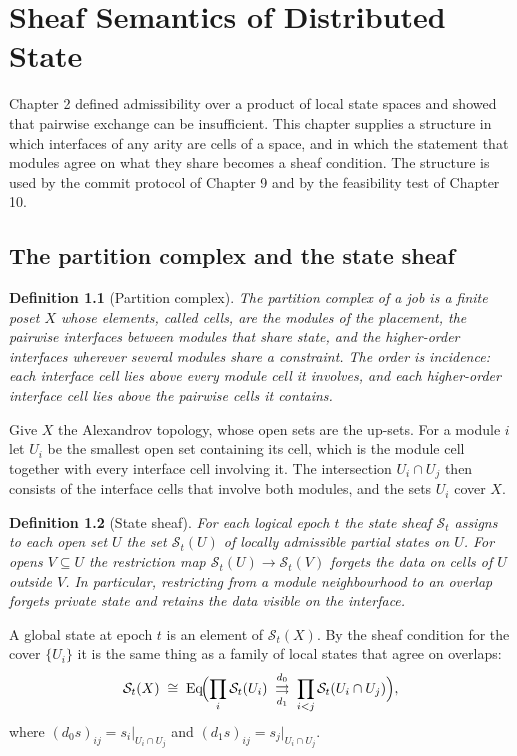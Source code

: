 \documentclass[11pt,openany]{book}
\newtheorem{definition}{Definition}[chapter]
\theoremstyle{remark}
\begin{document}
\chapter{Sheaf Semantics of Distributed State}

Chapter 2 defined admissibility over a product of local state spaces and showed that pairwise exchange can be insufficient. This chapter supplies a structure in which interfaces of any arity are cells of a space, and in which the statement that modules agree on what they share becomes a sheaf condition. The structure is used by the commit protocol of Chapter 9 and by the feasibility test of Chapter 10.

\section{The partition complex and the state sheaf}

\begin{definition}[Partition complex]
The partition complex of a job is a finite poset $X$ whose elements, called cells, are the modules of the placement, the pairwise interfaces between modules that share state, and the higher-order interfaces wherever several modules share a constraint. The order is incidence: each interface cell lies above every module cell it involves, and each higher-order interface cell lies above the pairwise cells it contains.
\end{definition}

Give $X$ the Alexandrov topology, whose open sets are the up-sets. For a module $i$ let $U_i$ be the smallest open set containing its cell, which is the module cell together with every interface cell involving it. The intersection $U_i\cap U_j$ then consists of the interface cells that involve both modules, and the sets $U_i$ cover $X$.

\begin{definition}[State sheaf]
For each logical epoch $t$ the state sheaf $\mathcal S_t$ assigns to each open set $U$ the set $\mathcal S_t(U)$ of locally admissible partial states on $U$. For opens $V\subseteq U$ the restriction map $\mathcal S_t(U)\to\mathcal S_t(V)$ forgets the data on cells of $U$ outside $V$. In particular, restricting from a module neighbourhood to an overlap forgets private state and retains the data visible on the interface.
\end{definition}

A global state at epoch $t$ is an element of $\mathcal S_t(X)$. By the sheaf condition for the cover $\{U_i\}$ it is the same thing as a family of local states that agree on overlaps:
\[
\mathcal S_t(X)\;\cong\;\operatorname{Eq}\!\Bigl(\prod_i\mathcal S_t(U_i)\;\overset{d_0}{\underset{d_1}{\rightrightarrows}}\;\prod_{i<j}\mathcal S_t(U_i\cap U_j)\Bigr),
\]
where $(d_0 s)_{ij}=s_i|_{U_i\cap U_j}$ and $(d_1 s)_{ij}=s_j|_{U_i\cap U_j}$.
\end{document}
